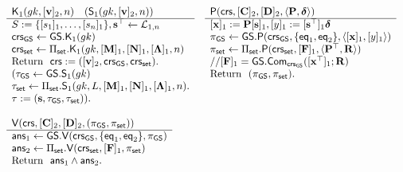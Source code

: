\begin{figure}
\begin{\algSize}
$$
\begin{array}{ll}
\begin{array}{l}
\algK_1(\gk,[\vecb{v}]_2,n)\quad (\mathsf{S}_1(\gk,[\vecb{v}]_2,n))\\
\hline
S:=\{[s_1]_1,\ldots,[s_n]_1\}, \vecb{s}^\top\gets\distlin_{1,n}\\
\crs_\GS\gets\GS.\algK_1(\gk)\\
{\crs_\sfset\gets\Pi_\sfset.\algK_1(\gk,[\matr{M}]_1,[\matr{N}]_1,[\matr{\Lambda}]_1,n)}\\
\text{Return } \ \crs:=([\vecb{v}]_2,\crs_\GS,\crs_\sfset).\\
(\tau_\GS\gets\GS.\algS_1(\gk)\\
\tau_\sfset\gets\Pi_\sfset.\algS_1(\gk,L,[\matr{M}]_1,[\matr{N}]_1,[\matr{\Lambda}]_1,n).\\
\tau := (\vecb{s},\tau_\GS,\tau_\sfset)).\\
\\
\end{array}
&
\begin{array}{l}
{\algP(\crs, [\matr{C}]_2, [\matr{D}]_2,\langle \matr{P}, \grkb{\delta}\rangle)}\\
\hline
[\vecb{x}]_1 := \matr{P}[\vecb{s}]_1,
[y]_1 := [\vecb{s}^\top]_1\grkb{\delta}\\
\pi_\GS\gets\GS.\algP(\crs_\GS,\{\eq_1,\eq_2\},\langle[\vecb{x}]_1,[y]_1\rangle)\\
\pi_\sfset \gets \Pi_\sfset.\algP(\crs_\sfset, [\matr{F}]_1,\langle\matr{P}^\top,\matr{R}\rangle)\\
//{[\matr{F}]_1} = \GS.\Com_{\crs_\GS}([\vecb{x}^\top]_1;\matr{R})\\
\text{Return } \  (\pi_\GS,\pi_\sfset). \\
\\
\\
\\
\end{array}\\
\begin{array}{l}
{\algV(\crs,[\matr{C}]_2,[\matr{D}]_2,(\pi_\GS,\pi_\sfset))}\\
\hline
\mathsf{ans}_1 \gets \GS.\algV(\crs_\GS,\{\eq_1,\eq_2\},\pi_\GS)\\
\mathsf{ans}_2 \gets \Pi_\sfset.\algV(\crs_\sfset,[\matr{F}]_1,\pi_\sfset)\\
\text{Return } \ \mathsf{ans}_1\wedge\mathsf{ans}_2.

\end{array}
\end{array}$$
\end{\algSize}
\end{figure}
